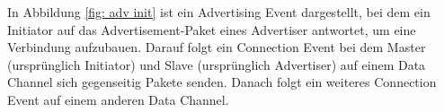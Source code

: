 In Abbildung \ref{fig: adv init} ist ein Advertising Event dargestellt, bei dem ein Initiator auf das Advertisement-Paket eines Advertiser antwortet, um eine Verbindung aufzubauen. Darauf folgt ein Connection Event bei dem Master (ursprünglich Initiator) und Slave (ursprünglich Advertiser) auf einem Data Channel sich gegenseitig Pakete senden. Danach folgt ein weiteres Connection Event auf einem anderen Data Channel.
